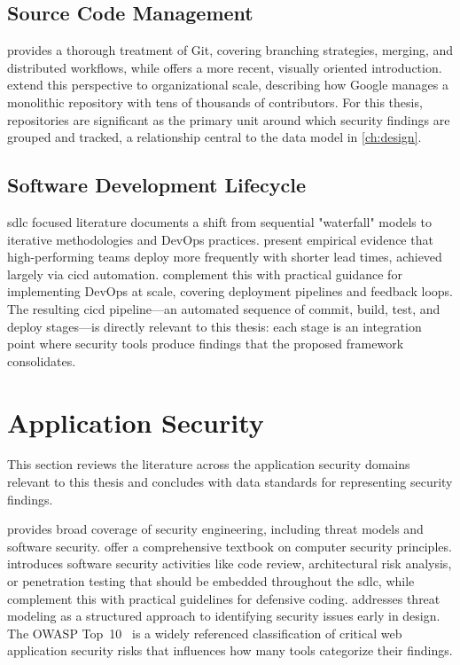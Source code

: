 \subsection{Source Code Management}

\textcite{Chacon2014} provides a thorough treatment of Git, covering branching strategies, merging, and distributed workflows, while \textcite{Skoulikari2024} offers a more recent, visually oriented introduction. \textcite{Winters2020} extend this perspective to organizational scale, describing how Google manages a monolithic repository with tens of thousands of contributors. For this thesis, repositories are significant as the primary unit around which security findings are grouped and tracked, a relationship central to the data model in \autoref{ch:design}.

\subsection{Software Development Lifecycle}

\gls{sdlc} focused literature documents a shift from sequential "waterfall" models to iterative methodologies and DevOps practices. \textcite{Forsgren2018} present empirical evidence that high-performing teams deploy more frequently with shorter lead times, achieved largely via \gls{cicd} automation. \textcite{Kim2021} complement this with practical guidance for implementing DevOps at scale, covering deployment pipelines and feedback loops. The resulting \gls{cicd} pipe\-line---an automated sequence of commit, build, test, and deploy stages---is directly relevant to this thesis: each stage is an integration point where security tools produce findings that the proposed framework consolidates.


\section{Application Security}
\label{sec:appsec-literature}

This section reviews the literature across the application security domains relevant to this thesis and concludes with data standards for representing security findings.

\textcite{Anderson2020} provides broad coverage of security engineering, including threat models and software security. \textcite{Stallings2024} offer a comprehensive textbook on computer security principles. \textcite{McGraw2006} introduces software security activities like code review, architectural risk analysis, or penetration testing that should be embedded throughout the \gls{sdlc}, while \textcite{Howard2006} complement this with practical guidelines for defensive coding. \textcite{Shostack2014} addresses threat modeling as a structured approach to identifying security issues early in design. The OWASP Top~10~\parencite{OWASP2021} is a widely referenced classification of critical web application security risks that influences how many tools categorize their findings.

